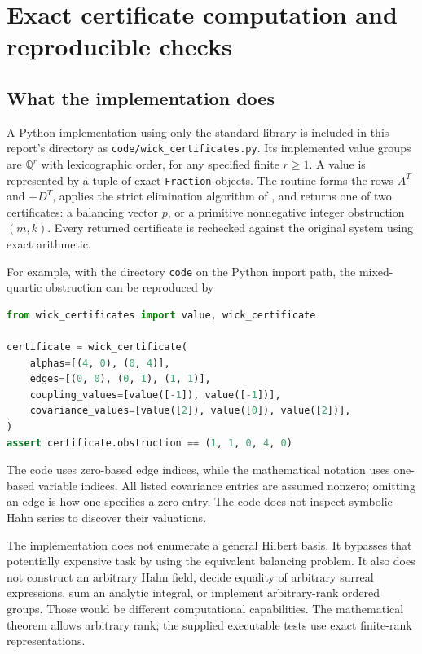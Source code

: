 \documentclass[11pt,letterpaper]{article}
\numberwithin{equation}{section}
\theoremstyle{definition}
\theoremstyle{remark}
\newcommand{\Q}{\mathbb Q}
\begin{document}
\section{Exact certificate computation and reproducible checks}
\label{wick:sec:code}

\subsection{What the implementation does}
\label{wick:sub:implementation}

A Python implementation using only the standard library is included in
this report's directory as \texttt{code/wick\_certificates.py}. Its
implemented value groups are $\Q^r$ with lexicographic order, for any
specified finite $r\ge1$.
A value is represented by a tuple of exact \texttt{Fraction} objects.
The routine forms the rows $A^T$ and $-D^T$, applies the strict elimination
algorithm of , and returns one of two certificates:
a balancing vector $p$, or a primitive nonnegative integer obstruction
$(m,k)$. Every returned certificate is rechecked against the original
system using exact arithmetic.

For example, with the directory \texttt{code} on the Python import path,
the mixed-quartic obstruction can be reproduced by
\begin{lstlisting}[language=Python]
from wick_certificates import value, wick_certificate

certificate = wick_certificate(
    alphas=[(4, 0), (0, 4)],
    edges=[(0, 0), (0, 1), (1, 1)],
    coupling_values=[value([-1]), value([-1])],
    covariance_values=[value([2]), value([0]), value([2])],
)
assert certificate.obstruction == (1, 1, 0, 4, 0)
\end{lstlisting}
The code uses zero-based edge indices, while the mathematical notation uses
one-based variable indices. All listed covariance entries are assumed
nonzero; omitting an edge is how one specifies a zero entry. The code does
not inspect symbolic Hahn series to discover their valuations.

The implementation does not enumerate a general Hilbert basis. It bypasses
that potentially expensive task by using the equivalent balancing problem.
It also does not construct an arbitrary Hahn field, decide equality of
arbitrary surreal expressions, sum an analytic integral, or implement
arbitrary-rank ordered groups. Those would be different computational
capabilities. The mathematical theorem allows arbitrary rank; the supplied
executable tests use exact finite-rank representations.
\end{document}
